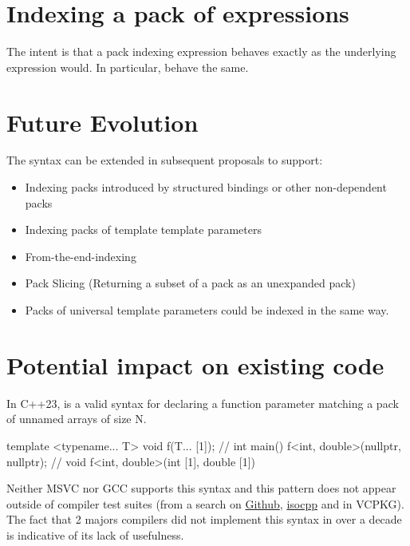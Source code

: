 \documentclass{wg21}
\begin{document}
\section{Indexing a pack of expressions}

The intent is that a pack indexing expression behaves exactly as the underlying expression would.
In particular,  behave the same.

\section{Future Evolution}

The syntax can be extended  in subsequent proposals to support:

\begin{itemize}
\item Indexing packs introduced by structured bindings or other non-dependent packs
\item Indexing packs of template template parameters
\item From-the-end-indexing
\item Pack Slicing (Returning a subset of a pack as an unexpanded pack)
\item Packs of universal template parameters could be indexed in the same way.
\end{itemize}


\section{Potential impact on existing code}

In C++23,  is a valid syntax for declaring a function parameter matching a pack of unnamed arrays of size N.

\begin{colorblock}
template <typename... T>
void f(T... [1]); //
int main() {
    f<int, double>(nullptr, nullptr); // void f<int, double>(int [1], double [1])
}
\end{colorblock}

Neither MSVC nor GCC supports this syntax and this pattern does not appear outside of compiler test suites (from a search on \href{https://cs.github.com/}{Github}, \href{https://codesearch.isocpp.org/cgi-bin/cgi_ppsearch?q=...%5B&search=Search}{isocpp} and in VCPKG).
The fact that 2 majors compilers did not implement this syntax in over a decade is indicative of its lack of usefulness.
\end{document}
